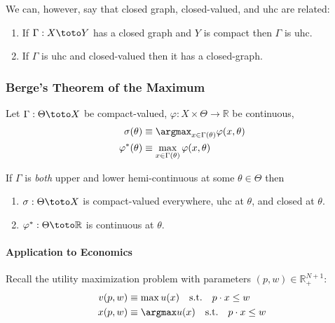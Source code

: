 \documentclass{article}
\begin{document}
We can, however, say that closed graph, closed-valued, and uhc are related:
\begin{claim}
  \begin{enumerate}
    \item If $\Gamma: X \toto Y$ has a closed graph and $Y$ is compact then $\Gamma$ is uhc.

    \item If $\Gamma$ is uhc and closed-valued then it has a closed-graph.
  \end{enumerate}
\end{claim}

\subsubsection{Berge's Theorem of the Maximum}
\label{ssub:berge_s_theorem_of_the_maximum}

\begin{theorem}\label{thm:lecture4_correspondences_maximum_theorem}
  Let $\Gamma: \Theta \toto X$ be compact-valued, $\varphi: X \times \Theta \to \mathbb{R}$ be continuous,
  \begin{align*}
    \sigma(\theta)
    &
    \equiv
    \argmax_{x \in \Gamma(\theta)}
    \varphi(x, \theta)
    \\
    \varphi^*(\theta)
    &
    \equiv
    \max_{x \in \Gamma(\theta)}
    \varphi(x, \theta)
  \end{align*}

  If $\Gamma$ is \textit{both} upper and lower hemi-continuous at some $\theta \in \Theta$ then
  \begin{enumerate}
    \item $\sigma: \Theta \toto X$ is compact-valued everywhere, uhc at $\theta$, and closed at $\theta$.

    \item $\varphi^*: \Theta \toto \mathbb{R}$ is continuous at $\theta$.
  \end{enumerate}
\end{theorem}

\paragraph{Application to Economics}
\label{par:application_to_economics}

Recall the utility maximization problem with parameters $(p, w) \in \mathbb{R}^{N + 1}_{+}$:
\begin{align*}
  v(p, w)
  &
  \equiv
  \max u(x)
  \quad
  \text{s.t.}
  \quad
  p \cdot x \le w
  \\
  x(p, w)
  &
  \equiv
  \argmax u(x)
  \quad
  \text{s.t.}
  \quad
  p \cdot x \le w
\end{align*}
\end{document}

